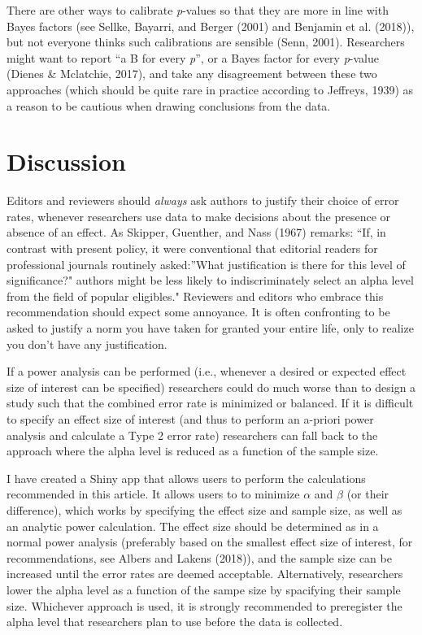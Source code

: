 \documentclass[,jou,floatsintext]{apa6}
\begin{document}
There are other ways to calibrate \emph{p}-values so that they are more in line with Bayes factors (see Sellke, Bayarri, and Berger (2001) and Benjamin et al. (2018)), but not everyone thinks such calibrations are sensible (Senn, 2001). Researchers might want to report \enquote{a B for every \emph{p}}, or a Bayes factor for every \emph{p}-value (Dienes \& Mclatchie, 2017), and take any disagreement between these two approaches (which should be quite rare in practice according to Jeffreys, 1939) as a reason to be cautious when drawing conclusions from the data.

\hypertarget{discussion}{%
\section{Discussion}\label{discussion}}

Editors and reviewers should \emph{always} ask authors to justify their choice of error rates, whenever researchers use data to make decisions about the presence or absence of an effect. As Skipper, Guenther, and Nass (1967) remarks: \enquote{If, in contrast with present policy, it were conventional that editorial readers for professional journals routinely asked:}What justification is there for this level of significance?" authors might be less likely to indiscriminately select an alpha level from the field of popular eligibles." Reviewers and editors who embrace this recommendation should expect some annoyance. It is often confronting to be asked to justify a norm you have taken for granted your entire life, only to realize you don't have any justification.

If a power analysis can be performed (i.e., whenever a desired or expected effect size of interest can be specified) researchers could do much worse than to design a study such that the combined error rate is minimized or balanced. If it is difficult to specify an effect size of interest (and thus to perform an a-priori power analysis and calculate a Type 2 error rate) researchers can fall back to the approach where the alpha level is reduced as a function of the sample size.

I have created a Shiny app that allows users to perform the calculations recommended in this article. It allows users to to minimize \(\alpha\) and \(\beta\) (or their difference), which works by specifying the effect size and sample size, as well as an analytic power calculation. The effect size should be determined as in a normal power analysis (preferably based on the smallest effect size of interest, for recommendations, see Albers and Lakens (2018)), and the sample size can be increased until the error rates are deemed acceptable. Alternatively, researchers lower the alpha level as a function of the sampe size by spacifying their sample size. Whichever approach is used, it is strongly recommended to preregister the alpha level that researchers plan to use before the data is collected.
\end{document}
